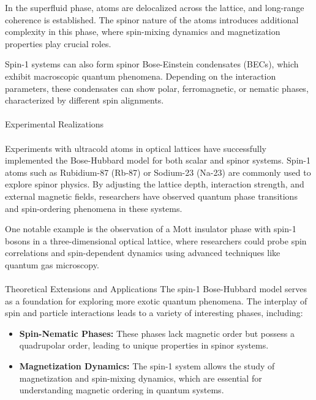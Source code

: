 
In the superfluid phase, atoms are delocalized across the lattice, and long-range coherence is established. The spinor nature of the atoms introduces additional complexity in this phase, where spin-mixing dynamics and magnetization properties play crucial roles.


Spin-1 systems can also form spinor Bose-Einstein condensates (BECs), which exhibit macroscopic quantum phenomena. Depending on the interaction parameters, these condensates can show polar, ferromagnetic, or nematic phases, characterized by different spin alignments.\\ \\
\textcolor{myred}{Experimental Realizations}\\ \\
Experiments with ultracold atoms in optical lattices have successfully implemented the Bose-Hubbard model for both scalar and spinor systems. Spin-1 atoms such as Rubidium-87 (Rb-87) or Sodium-23 (Na-23) are commonly used to explore spinor physics. By adjusting the lattice depth, interaction strength, and external magnetic fields, researchers have observed quantum phase transitions and spin-ordering phenomena in these systems.

One notable example is the observation of a Mott insulator phase with spin-1 bosons in a three-dimensional optical lattice, where researchers could probe spin correlations and spin-dependent dynamics using advanced techniques like quantum gas microscopy.\\ \\
\textcolor{myred}{Theoretical Extensions and Applications}
The spin-1 Bose-Hubbard model serves as a foundation for exploring more exotic quantum phenomena. The interplay of spin and particle interactions leads to a variety of interesting phases, including:
\begin{itemize}
    \item \textbf{Spin-Nematic Phases:} These phases lack magnetic order but possess a quadrupolar order, leading to unique properties in spinor systems.
    \item \textbf{Magnetization Dynamics:} The spin-1 system allows the study of magnetization and spin-mixing dynamics, which are essential for understanding magnetic ordering in quantum systems.
\end{itemize}

